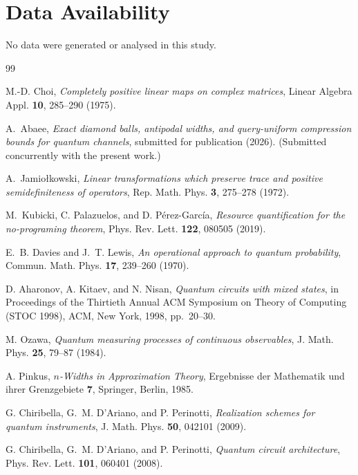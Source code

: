 \documentclass[11pt,a4paper]{article}
\begin{document}
\section*{Data Availability}
No data were generated or analysed in this study.

\begin{thebibliography}{99}

M.-D. Choi, \emph{Completely positive linear maps on complex matrices}, Linear Algebra Appl. \textbf{10}, 285--290 (1975).

A.~Abaee, \emph{Exact diamond balls, antipodal widths, and query-uniform compression bounds for quantum channels}, submitted for publication (2026). (Submitted concurrently with the present work.)

A.~Jamio{\l}kowski, \emph{Linear transformations which preserve trace and positive semidefiniteness of operators}, Rep. Math. Phys. \textbf{3}, 275--278 (1972).

M.~Kubicki, C. Palazuelos, and D. P\'erez-Garc\'ia, \emph{Resource quantification for the no-programing theorem}, Phys. Rev. Lett. \textbf{122}, 080505 (2019).

E.~B. Davies and J.~T. Lewis, \emph{An operational approach to quantum probability}, Commun. Math. Phys. \textbf{17}, 239--260 (1970).

D. Aharonov, A. Kitaev, and N. Nisan, \emph{Quantum circuits with mixed states}, in Proceedings of the Thirtieth Annual ACM Symposium on Theory of Computing (STOC 1998), ACM, New York, 1998, pp.~20--30.

M. Ozawa, \emph{Quantum measuring processes of continuous observables}, J. Math. Phys. \textbf{25}, 79--87 (1984).

A. Pinkus, \emph{$n$-Widths in Approximation Theory}, Ergebnisse der Mathematik und ihrer Grenzgebiete \textbf{7}, Springer, Berlin, 1985.

G. Chiribella, G.~M. D'Ariano, and P. Perinotti, \emph{Realization schemes for quantum instruments}, J. Math. Phys. \textbf{50}, 042101 (2009).

G. Chiribella, G.~M. D'Ariano, and P. Perinotti, \emph{Quantum circuit architecture}, Phys. Rev. Lett. \textbf{101}, 060401 (2008).


\end{thebibliography}
\end{document}
